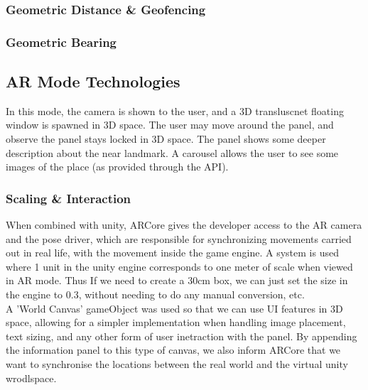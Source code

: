 \subsubsection{Geometric Distance \& Geofencing}
\subsubsection{Geometric Bearing}




\subsection{AR Mode Technologies}
In this mode, the camera is shown to the user, and a 3D transluscnet floating window is spawned in 3D space.
The user may move around the panel, and observe the panel stays locked in 3D space. The panel shows
some deeper description about the near landmark. A carousel allows the user to see some images of the place
 (as provided through the API). 


\subsubsection{Scaling \& Interaction}
When combined with unity, ARCore gives the developer access to the AR camera and the pose driver, which are responsible for synchronizing movements 
carried out in real life, with the movement inside the game engine. A system is used where 1 unit in the unity engine corresponds to one meter of scale when 
viewed in AR mode. Thus If we need to create a 30cm box, we can just set the size in the engine to 0.3, without needing to do any manual conversion, etc.\\

 A 'World Canvas' gameObject was used so that we can use UI features in 3D space, allowing for a simpler implementation when handling image placement, text sizing, 
 and any other form of user inetraction with the panel. By appending the information panel to this type of canvas, we also inform ARCore that we want to synchronise 
 the locations between the real world and the virtual unity wrodlspace.

